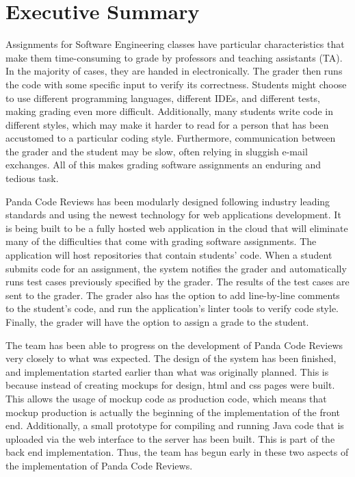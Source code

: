 \part*{Executive Summary}

Assignments for Software Engineering classes have particular characteristics
that make them time-consuming to grade by professors and teaching assistants
(TA). In the majority of cases, they are handed in electronically. The grader
then runs the code with some specific input to verify its correctness. Students
might choose to use different programming languages, different IDEs, and
different tests, making grading even more difficult. Additionally, many students
write code in different styles, which may make it harder to read for a person
that has been accustomed to a particular coding style. Furthermore,
communication between the grader and the student may be slow, often relying in
sluggish e-mail exchanges. All of this makes grading software assignments an
enduring and tedious task.

Panda Code Reviews has been modularly designed following industry leading
standards and using the newest technology for web applications development. It
is being built to be a fully hosted web application in the cloud that will
eliminate many of the difficulties that come with grading software assignments.
The application will host repositories that contain students' code. When a
student submits code for an assignment, the system notifies the grader and
automatically runs test cases previously specified by the grader. The results of
the test cases are sent to the grader. The grader also has the option to add
line-by-line comments to the student's code, and run the application's linter
tools to verify code style. Finally, the grader will have the option to assign a
grade to the student.

The team has been able to progress on the development of Panda Code Reviews very
closely to what was expected. The design of the system has been finished, and
implementation started earlier than what was originally planned. This is because
instead of creating mockups for design, html and css pages were built. This
allows the usage of mockup code as production code, which means that mockup
production is actually the beginning of the implementation of the front end.
Additionally, a small prototype for compiling and running Java code that is
uploaded via the web interface to the server has been built. This is part of the
back end implementation. Thus, the team has begun early in these two aspects of
the implementation of Panda Code Reviews.

